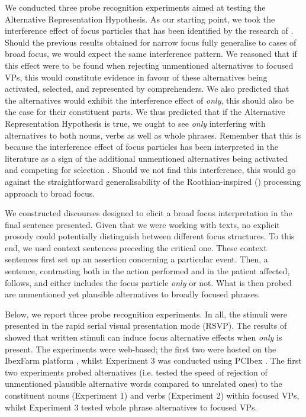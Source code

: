 \documentclass[output=paper,colorlinks,citecolor=brown]{langscibook}
\begin{document}
We conducted three probe recognition experiments aimed at testing the Alternative Representation Hypothesis. As our starting point, we took the interference effect of focus particles that has been identified by the research of \citet{gotzner2016impact}. Should the previous results obtained for narrow focus fully generalise to cases of broad focus, we would expect the same interference pattern. We reasoned that if this effect were to be found when rejecting unmentioned alternatives to focused VPs, this would constitute evidence in favour of these alternatives being activated, selected, and represented by comprehenders. We also predicted that the alternatives would exhibit the interference effect of \textit{only}, this should also be the case for their constituent parts. We thus predicted that if the Alternative Representation Hypothesis is true, we ought to see \textit{only} interfering with alternatives to both nouns, verbs as well as whole phrases. Remember that this is because the interference effect of focus particles has been interpreted in the literature as a sign of the additional unmentioned alternatives being activated and competing for selection \citep{gotzner2016impact}. Should we not find this interference, this would go against the straightforward generalisability of the Roothian-inspired (\citeyear{rooth1992}) processing approach to broad focus.

We constructed discourses designed to elicit a broad focus interpretation in the final sentence presented. Given that we were working with texts, no explicit prosody could potentially distinguish between different focus structures. To this end, we used context sentences preceding the critical one. These context sentences first set up an assertion concerning a particular event. Then, a sentence, contrasting both in the action performed and in the patient affected, follows, and either includes the focus particle \textit{only} or not. What is then probed are unmentioned yet plausible alternatives to broadly focused phrases. 

Below, we report three probe recognition experiments. In all, the stimuli were presented in the rapid serial visual presentation mode (RSVP). The results of \citet{byram2011focus} showed that written stimuli can induce focus alternative effects when \textit{only} is present. The experiments were web-based; the first two were hosted on the IbexFarm platform \citep{DrummondA2013}, whilst Experiment 3 was conducted using PCIbex \citep{ZehrSchwarz2018}. The first two experiments probed alternatives (i.e. tested the speed of rejection of unmentioned plausible alternative words compared to unrelated ones) to the constituent nouns (Experiment 1) and verbs (Experiment 2) within focused VPs, whilst Experiment 3 tested whole phrase alternatives to focused VPs.
\end{document}
